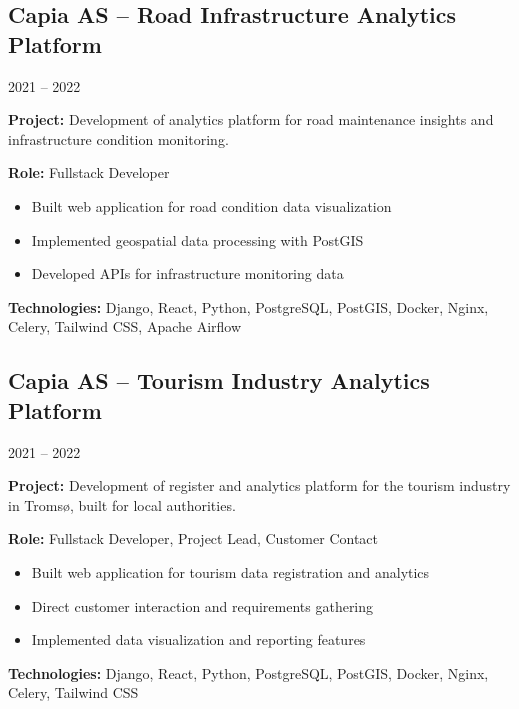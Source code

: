 \documentclass[10pt, a4paper]{article}
\begin{document}
\vspace{0.8em}
\subsection*{Capia AS -- Road Infrastructure Analytics Platform}
{\small\color{lightgray}2021 -- 2022}

{\small
\textbf{Project:} Development of analytics platform for road maintenance insights and infrastructure condition monitoring.

\textbf{Role:} Fullstack Developer

\begin{itemize}[noitemsep, leftmargin=1.2em, topsep=0.2em]
    \item Built web application for road condition data visualization
    \item Implemented geospatial data processing with PostGIS
    \item Developed APIs for infrastructure monitoring data
\end{itemize}

\textbf{Technologies:} Django, React, Python, PostgreSQL, PostGIS, Docker, Nginx, Celery, Tailwind CSS, Apache Airflow
}

\vspace{0.8em}
\subsection*{Capia AS -- Tourism Industry Analytics Platform}
{\small\color{lightgray}2021 -- 2022}

{\small
\textbf{Project:} Development of register and analytics platform for the tourism industry in Tromsø, built for local authorities.

\textbf{Role:} Fullstack Developer, Project Lead, Customer Contact

\begin{itemize}[noitemsep, leftmargin=1.2em, topsep=0.2em]
    \item Built web application for tourism data registration and analytics
    \item Direct customer interaction and requirements gathering
    \item Implemented data visualization and reporting features
\end{itemize}

\textbf{Technologies:} Django, React, Python, PostgreSQL, PostGIS, Docker, Nginx, Celery, Tailwind CSS
}

\vspace{0.8em}
\end{document}
